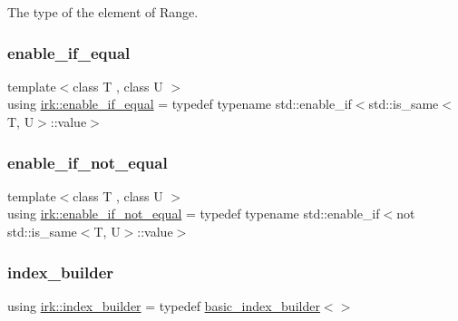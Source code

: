 The type of the element of Range. 

\mbox{\label{namespaceirk_a57b757ac14c20845b38f720c2ad8e822}} 
\subsubsection{\texorpdfstring{enable\+\_\+if\+\_\+equal}{enable\_if\_equal}}
{\footnotesize\ttfamily template$<$class T , class U $>$ \\
using \mbox{\hyperlink{namespaceirk_a57b757ac14c20845b38f720c2ad8e822}{irk\+::enable\+\_\+if\+\_\+equal}} = typedef typename std\+::enable\+\_\+if$<$std\+::is\+\_\+same$<$T, U$>$\+::value$>$}

\mbox{\label{namespaceirk_a4a138aaf92a8812dae06fe222084c969}} 
\subsubsection{\texorpdfstring{enable\+\_\+if\+\_\+not\+\_\+equal}{enable\_if\_not\_equal}}
{\footnotesize\ttfamily template$<$class T , class U $>$ \\
using \mbox{\hyperlink{namespaceirk_a4a138aaf92a8812dae06fe222084c969}{irk\+::enable\+\_\+if\+\_\+not\+\_\+equal}} = typedef typename std\+::enable\+\_\+if$<$not std\+::is\+\_\+same$<$T, U$>$\+::value$>$}

\mbox{\label{namespaceirk_a5d414f06e9be9b0e06236aa7fd41130b}} 
\subsubsection{\texorpdfstring{index\+\_\+builder}{index\_builder}}
{\footnotesize\ttfamily using \mbox{\hyperlink{namespaceirk_a5d414f06e9be9b0e06236aa7fd41130b}{irk\+::index\+\_\+builder}} = typedef \mbox{\hyperlink{classirk_1_1basic__index__builder}{basic\+\_\+index\+\_\+builder}}$<$$>$}

\mbox{\label{namespaceirk_abf02801860e10848db8a39845005f0c4}} 
